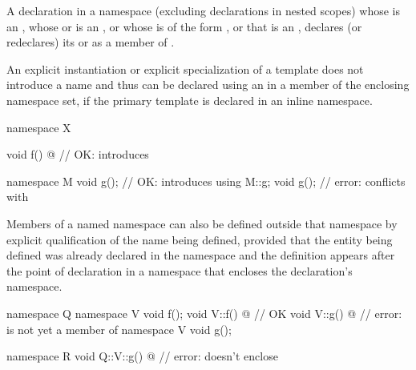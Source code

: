 \pnum
A declaration in a namespace  (excluding declarations in nested scopes)
whose  is an ,
whose  or
 is an , or
whose  is of the form 
 , or
that is an ,
declares (or redeclares) its  or
 as a member of .
\begin{note}
An explicit instantiation or
explicit specialization of a template
does not introduce a name and thus can be declared using an
 in a member of the enclosing namespace set,
if the primary template is declared in an inline namespace.
\end{note}
\begin{example}
\begin{codeblock}
namespace X {
  void f() { @\commentellip@ }        // OK: introduces 

  namespace M {
    void g();                   // OK: introduces 
  }
  using M::g;
  void g();                     // error: conflicts with 
}
\end{codeblock}
\end{example}

\pnum
Members of a named namespace can also be
defined outside that namespace by explicit
qualification of the name being defined, provided
that the entity being defined was already declared in the namespace and
the definition appears after the point of declaration in a namespace
that encloses the declaration's namespace.
\begin{example}
\begin{codeblock}
namespace Q {
  namespace V {
    void f();
  }
  void V::f() { @\commentellip@ }     // OK
  void V::g() { @\commentellip@ }     // error:  is not yet a member of 
  namespace V {
    void g();
  }
}

namespace R {
  void Q::V::g() { @\commentellip@ }  // error:  doesn't enclose 
}
\end{codeblock}
\end{example}

